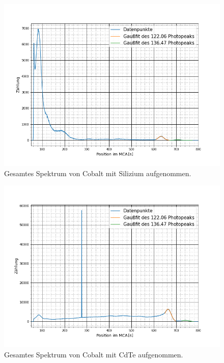 \begin{figure}[ht]
	\includegraphics[scale=0.5]{Bild/CSg}
	\centering
	\caption{Gesamtes Spektrum von Cobalt mit Silizium aufgenommen.}
\end{figure}
\begin{figure}[ht]
	\includegraphics[scale=0.5]{Bild/CCg}
	\centering
	\caption{Gesamtes Spektrum von Cobalt mit CdTe aufgenommen.}
\end{figure}